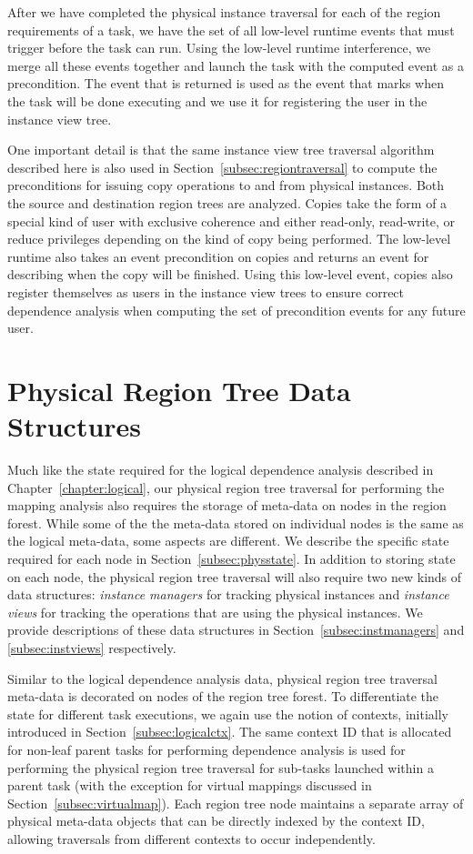 After we have completed the physical instance
traversal for each of the region requirements
of a task, we have the set of all low-level
runtime events that must trigger before the
task can run.  Using the low-level runtime 
interference, we merge all these events together
and launch the task with the computed event
as a precondition.  The event that is returned
is used as the event that marks when the task
will be done executing and we use it for registering
the user in the instance view tree.

One important detail is that the same instance
view tree traversal algorithm described here is
also used in Section~\ref{subsec:regiontraversal}
to compute the preconditions for issuing copy
operations to and from physical instances.  Both
the source and destination region trees are 
analyzed.  Copies take the form of a special
kind of user with exclusive coherence and 
either read-only, read-write, or reduce 
privileges depending on the kind of copy being 
performed. The low-level runtime also takes
an event precondition on copies and returns
an event for describing when the copy will
be finished. Using this low-level event,
copies also register themselves as
users in the instance view trees to ensure
correct dependence analysis when computing 
the set of precondition events for any
future user.


\section{Physical Region Tree Data Structures}
\label{sec:phystree}
Much like the state required for the logical
dependence analysis described in 
Chapter~\ref{chapter:logical}, our physical 
region tree traversal for performing the mapping
analysis also requires the storage of meta-data
on nodes in the region forest. While some of the
the meta-data stored on individual nodes is the
same as the logical meta-data, some aspects 
are different.  We describe the specific
state required for each node in 
Section~\ref{subsec:physstate}.
In addition to storing state on each node, the
physical region tree traversal will also require
two new kinds of data structures:
{\em instance managers} for tracking
physical instances and {\em instance views}
for tracking the operations that
are using the physical instances. 
We provide descriptions of these data
structures in Section~\ref{subsec:instmanagers}
and \ref{subsec:instviews} respectively.

Similar to the logical dependence analysis data,
physical region tree traversal meta-data is 
decorated on nodes of the region tree forest.
To differentiate the state for different
task executions, we again use the notion of
contexts, initially introduced in 
Section~\ref{subsec:logicalctx}. The same context
ID that is allocated for non-leaf parent tasks 
for performing dependence analysis is used for
performing the physical region tree traversal
for sub-tasks launched within a parent task
(with the exception for virtual mappings discussed in 
Section~\ref{subsec:virtualmap}). Each region tree
node maintains a separate array of physical meta-data
objects that can be directly indexed by the
context ID, allowing traversals from different
contexts to occur independently.

